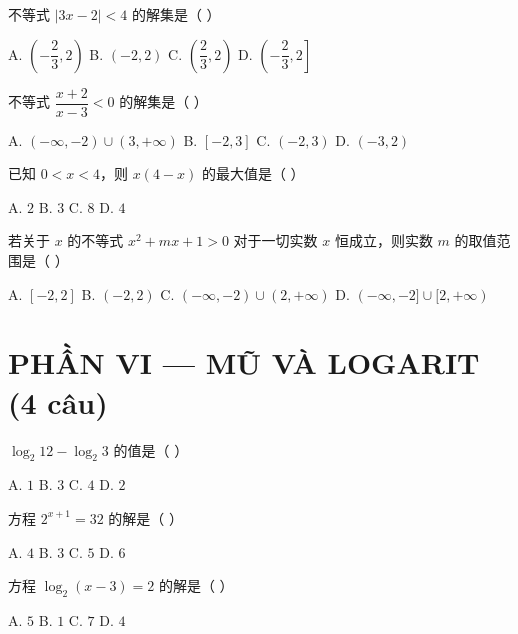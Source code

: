 \documentclass[11pt, a4paper]{article}
\begin{document}
\begin{baitap}[33]
不等式 $\lvert 3x - 2 \rvert < 4$ 的解集是（ ）
\par\vspace{3pt}
\noindent A. $\left(-\dfrac{2}{3}, 2\right)$ \quad B. $(-2, 2)$ \quad C. $\left(\dfrac{2}{3}, 2\right)$ \quad D. $\left(-\dfrac{2}{3}, 2\right]$
\end{baitap}

\begin{baitap}[34]
不等式 $\dfrac{x + 2}{x - 3} < 0$ 的解集是（ ）
\par\vspace{3pt}
\noindent A. $(-\infty, -2) \cup (3, +\infty)$ \quad B. $[-2, 3]$ \quad C. $(-2, 3)$ \quad D. $(-3, 2)$
\end{baitap}

\begin{baitap}[35]
已知 $0 < x < 4$，则 $x(4 - x)$ 的最大值是（ ）
\par\vspace{3pt}
\noindent A. $2$ \quad B. $3$ \quad C. $8$ \quad D. $4$
\end{baitap}

\begin{baitap}[36]
若关于 $x$ 的不等式 $x^2 + mx + 1 > 0$ 对于一切实数 $x$ 恒成立，则实数 $m$ 的取值范围是（ ）
\par\vspace{3pt}
\noindent A. $[-2, 2]$ \quad B. $(-2, 2)$ \quad C. $(-\infty, -2) \cup (2, +\infty)$ \quad D. $(-\infty, -2] \cup [2, +\infty)$
\end{baitap}

\section{PHẦN VI — MŨ VÀ LOGARIT (4 câu)}

\begin{baitap}[37]
$\log_2 12 - \log_2 3$ 的值是（ ）
\par\vspace{3pt}
\noindent A. $1$ \quad B. $3$ \quad C. $4$ \quad D. $2$
\end{baitap}

\begin{baitap}[38]
方程 $2^{x+1} = 32$ 的解是（ ）
\par\vspace{3pt}
\noindent A. $4$ \quad B. $3$ \quad C. $5$ \quad D. $6$
\end{baitap}

\begin{baitap}[39]
方程 $\log_2(x - 3) = 2$ 的解是（ ）
\par\vspace{3pt}
\noindent A. $5$ \quad B. $1$ \quad C. $7$ \quad D. $4$
\end{baitap}
\end{document}
